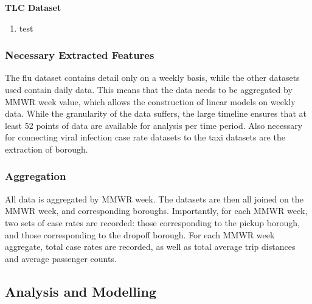 \documentclass[11pt]{article}
\begin{document}
\textbf{TLC Dataset}
\begin{enumerate}
    \item test
\end{enumerate}

\subsubsection{Necessary Extracted Features}
The flu dataset contains detail only on a weekly basis, 
while the other datasets used contain daily data. 
This means that the data needs to be aggregated by MMWR week value,
which allows the construction of linear models on weekly data.
While the granularity of the data suffers, 
the large timeline ensures that at least 52 points of data are available for analysis per time period.
Also necessary for connecting viral infection case rate datasets to the taxi datasets are the extraction of borough.

\subsubsection{Aggregation}

All data is aggregated by MMWR week.
The datasets are then all joined on the MMWR week, and corresponding boroughs.
Importantly, for each MMWR week, two sets of case rates are recorded: 
those corresponding to the pickup borough, and those corresponding to the dropoff borough.
For each MMWR week aggregate, total case rates are recorded, 
as well as total average trip distances and average passenger counts.

\subsection{Analysis and Modelling}



\end{document}
